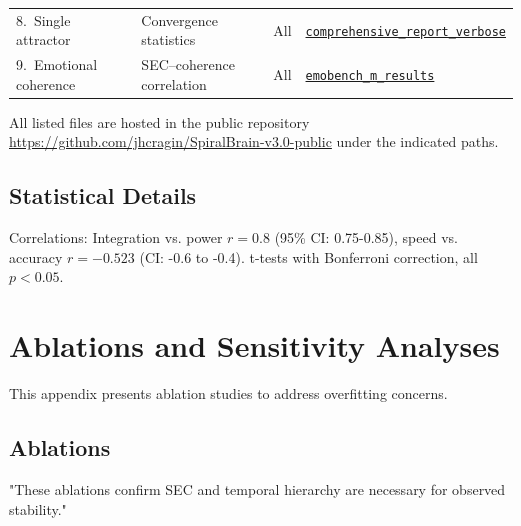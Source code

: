 \documentclass[11pt,a4paper]{article}
\begin{document}
\begin{table}[H]
{\begin{tabular}{L{3cm} L{3cm} L{3cm} L{6cm}}
8.\ Single attractor
  & Convergence statistics
  & All
  & \href{https://github.com/jhcragin/SpiralBrain-v3.0-public/blob/main/ELASTIC_COGNITION_SPIRAL_ARCHITECTURE/results/comprehensive_report_verbose_20251125_213442.json}
         {\texttt{comprehensive\_report\_verbose}} \\

9.\ Emotional coherence
  & SEC–coherence correlation
  & All
  & \href{https://github.com/jhcragin/SpiralBrain-v3.0-public/blob/main/ELASTIC_COGNITION_SPIRAL_ARCHITECTURE/results/emobench_m_results.json}
         {\texttt{emobench\_m\_results}} \\
\bottomrule
\end{tabular}
}
\end{table}

All listed files are hosted in the public repository
\url{https://github.com/jhcragin/SpiralBrain-v3.0-public} under the indicated paths.

\subsection{Statistical Details}

Correlations: Integration vs. power \(r = 0.8\) (95\% CI: 0.75-0.85), speed vs. accuracy \(r = -0.523\) (CI: -0.6 to -0.4). t-tests with Bonferroni correction, all \(p < 0.05\).

\section{Ablations and Sensitivity Analyses}
\label{app:ablations}

This appendix presents ablation studies to address overfitting concerns.

\subsection{Ablations}
\begin{table}[H]
\centering
\caption{Baseline comparisons under perturbation (100 runs, $\lambda=0.25$)}

\renewcommand{\arraystretch}{1.25}
\end{table}
"These ablations confirm SEC and temporal hierarchy are necessary for observed stability."
\end{document}
